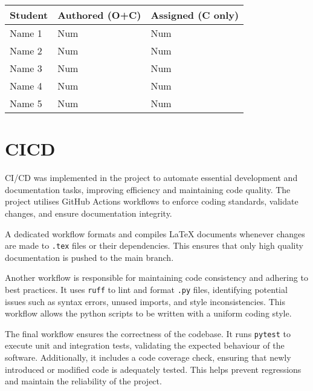 \documentclass{article}
\begin{document}

\begin{table}[H]
  \centering
  \begin{tabular}{lll}
    \toprule
    \textbf{Student} & \textbf{Authored (O+C)} & \textbf{Assigned (C only)}\\
    \midrule
    Name 1 & Num & Num \\
    Name 2 & Num & Num \\
    Name 3 & Num & Num \\
    Name 4 & Num & Num \\
    Name 5 & Num & Num \\
    \bottomrule
  \end{tabular}
\end{table}


\section{CICD}


CI/CD was implemented in the project to automate essential
development and documentation tasks, improving efficiency and
maintaining code quality. The project utilises GitHub Actions
workflows to enforce coding standards, validate changes, and ensure
documentation integrity.

A dedicated workflow formats and compiles \LaTeX{} documents whenever
changes are made to \texttt{.tex} files or their dependencies. This ensures that
only high quality documentation is pushed to the main branch.

Another workflow is responsible for maintaining code consistency and
adhering to best practices. It uses \texttt{ruff} to lint and format
\texttt{.py} files, identifying potential issues such as syntax
errors, unused imports, and style inconsistencies. This workflow
allows the python scripts to be written with a uniform coding style.

The final workflow ensures the correctness of the codebase. It runs
\texttt{pytest} to execute unit and integration tests, validating the
expected behaviour of the software. Additionally, it includes a code
coverage check, ensuring that newly introduced or modified code is
adequately tested. This helps prevent regressions and maintain the
reliability of the project.
\end{document}
